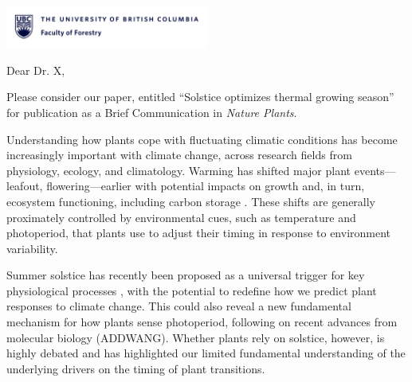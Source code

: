 \documentclass[11pt,a4paper]{article}
\begin{document}

\noindent \includegraphics[width=0.5\textwidth, right]{forestry_letterhead.png}

\noindent Dear Dr. X, %

\vspace{0.25cm} %

\noindent Please consider our paper, entitled ``Solstice optimizes thermal growing season'' for publication as a Brief Communication in \emph{Nature Plants}. 

\vspace{0.25cm}

\noindent Understanding how plants cope with fluctuating climatic conditions has become increasingly important with climate change, across research fields from physiology, ecology, and climatology. Warming has shifted major plant events---leafout, flowering---earlier \supercite{Menzel2006, Fu2019} with potential impacts on growth and, in turn, ecosystem functioning, including carbon storage \supercite{Keenan2014}. These shifts are generally proximately controlled by environmental cues, such as temperature and photoperiod, that plants use to adjust their timing in response to environment variability.

\vspace{0.25cm}
\noindent Summer solstice has recently been proposed as a universal trigger for key physiological processes \supercite{Zohner2023, Journe2024}, with the potential to redefine how we predict plant responses to climate change. This could also reveal a new fundamental mechanism for how plants sense photoperiod, following on recent advances from molecular biology (ADDWANG). Whether plants rely on solstice, however, is highly debated and has highlighted our limited fundamental understanding of the underlying drivers on the timing of plant transitions. 

\vspace{0.25cm}
\end{document}
